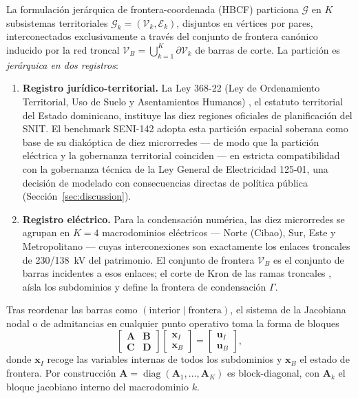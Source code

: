La formulación jerárquica de frontera-coordenada (HBCF) particiona $\mathcal{G}$ en $K$ subsistemas territoriales $\mathcal{G}_k = (\mathcal{V}_k, \mathcal{E}_k)$, disjuntos en vértices por pares, interconectados exclusivamente a través del conjunto de frontera canónico inducido por la red troncal $\mathcal{V}_B = \bigcup_{k=1}^{K} \partial \mathcal{V}_k$ de barras de corte. La partición es \emph{jerárquica en dos registros}:
\begin{enumerate}
\item \textbf{Registro jurídico-territorial.} La Ley 368-22 (Ley de Ordenamiento Territorial, Uso de Suelo y Asentamientos Humanos) \cite{ley368}, el estatuto territorial del Estado dominicano, instituye las diez regiones oficiales de planificación del SNIT. El benchmark SENI-142 adopta esta partición espacial soberana como base de su diakóptica de diez microrredes --- de modo que la partición eléctrica y la gobernanza territorial coinciden --- en estricta compatibilidad con la gobernanza técnica de la Ley General de Electricidad 125-01, una decisión de modelado con consecuencias directas de política pública (Sección~\ref{sec:discussion}).
\item \textbf{Registro eléctrico.} Para la condensación numérica, las diez microrredes se agrupan en $K = 4$ macrodominios eléctricos --- Norte (Cibao), Sur, Este y Metropolitano --- cuyas interconexiones son exactamente los enlaces troncales de 230/138~kV del patrimonio. El conjunto de frontera $\mathcal{V}_B$ es el conjunto de barras incidentes a esos enlaces; el corte de Kron de las ramas troncales \cite{kron1963}, \cite{happ1971} aísla los subdominios y define la frontera de condensación $\Gamma$.
\end{enumerate}

Tras reordenar las barras como $(\text{interior} \mid \text{frontera})$, el sistema de la Jacobiana nodal o de admitancias en cualquier punto operativo toma la forma de bloques
\begin{equation}
\begin{bmatrix} \mathbf{A} & \mathbf{B} \\ \mathbf{C} & \mathbf{D} \end{bmatrix} \begin{bmatrix} \mathbf{x}_I \\ \mathbf{x}_B \end{bmatrix} = \begin{bmatrix} \mathbf{u}_I \\ \mathbf{u}_B \end{bmatrix},
\label{eq:blockform}
\end{equation}
donde $\mathbf{x}_I$ recoge las variables internas de todos los subdominios y $\mathbf{x}_B$ el estado de frontera. Por construcción $\mathbf{A} = \operatorname{diag}(\mathbf{A}_1, \dots, \mathbf{A}_K)$ es block-diagonal, con $\mathbf{A}_k$ el bloque jacobiano interno del macrodominio $k$.

